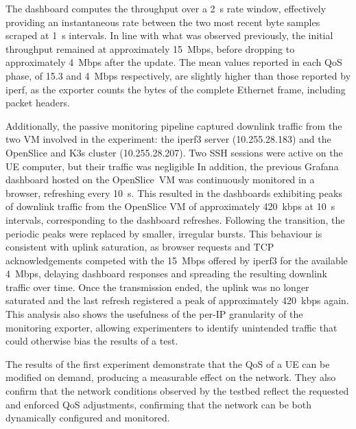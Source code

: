 The dashboard computes the throughput over a 2~s rate window, effectively providing an instantaneous rate between the two most recent byte samples scraped at 1~s intervals. In line with what was observed previously, the initial throughput remained at approximately 15~Mbps, before dropping to approximately 4~Mbps after the update. The mean values reported in each \acs{QoS} phase, of 15.3 and 4~Mbps respectively, are slightly higher than those reported by iperf, as the exporter counts the bytes of the complete Ethernet frame, including packet headers.

Additionally, the passive monitoring pipeline captured downlink traffic from the two \acs{VM} involved in the experiment: the iperf3 server (10.255.28.183) and the OpenSlice and K3s cluster (10.255.28.207). Two \acs{SSH} sessions were active on the \acs{UE} computer, but their traffic was negligible In addition, the previous Grafana dashboard hosted on the OpenSlice~\acs{VM} was continuously monitored in a browser, refreshing every 10~s. This resulted in the dashboards exhibiting peaks of downlink traffic from the OpenSlice \acs{VM} of approximately 420~kbps at 10~s intervals, corresponding to the dashboard refreshes. Following the transition, the periodic peaks were replaced by smaller, irregular bursts. This behaviour is consistent with uplink saturation, as browser requests and \acs{TCP} acknowledgements competed with the 15~Mbps offered by iperf3 for the available 4~Mbps, delaying dashboard responses and spreading the resulting downlink traffic over time. Once the transmission ended, the uplink was no longer saturated and the last refresh registered a peak of approximately 420~kbps again. This analysis also shows the usefulness of the per-\acs{IP} granularity of the monitoring exporter, allowing experimenters to identify unintended traffic that could otherwise bias the results of a test.

The results of the first experiment demonstrate that the \acs{QoS} of a \acs{UE} can be modified on demand, producing a measurable effect on the network. They also confirm that the network conditions observed by the testbed reflect the requested and enforced \acs{QoS} adjustments, confirming that the network can be both dynamically configured and monitored.

